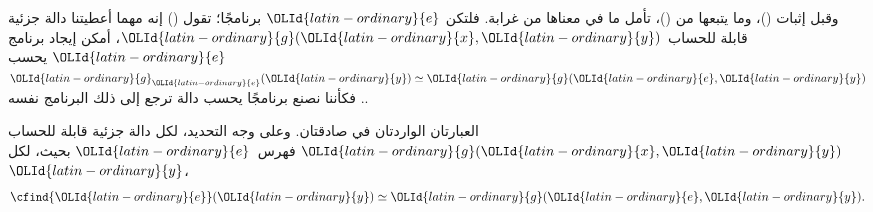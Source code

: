 \documentclass[../../../include/open-logic-section]{subfiles}
\begin{document}
\begin{explain}
وقبل إثبات ()، وما يتبعها من ()، تأمل ما في معناها من غرابة.
فلتكن $\OLId{latin-ordinary}{e}$ برنامجًا؛ تقول () إنه مهما أعطيتنا
دالة جزئية قابلة للحساب $\OLId{latin-ordinary}{g}(\OLId{latin-ordinary}{x},\OLId{latin-ordinary}{y})$، أمكن إيجاد برنامج $\OLId{latin-ordinary}{e}$
يحسب $\OLId{latin-ordinary}{g}_\OLId{latin-ordinary}{e}(\OLId{latin-ordinary}{y}) \simeq \OLId{latin-ordinary}{g}(\OLId{latin-ordinary}{e},\OLId{latin-ordinary}{y})$. فكأننا نصنع برنامجًا يحسب
دالة ترجع إلى ذلك البرنامج نفسه.
\end{explain}

\begin{thm}
العبارتان الواردتان في  صادقتان. وعلى وجه
التحديد، لكل دالة جزئية قابلة للحساب $\OLId{latin-ordinary}{g}(\OLId{latin-ordinary}{x},\OLId{latin-ordinary}{y})$ فهرس~$\OLId{latin-ordinary}{e}$ بحيث،
لكل~$\OLId{latin-ordinary}{y}$،
\[
\cfind{\OLId{latin-ordinary}{e}}(\OLId{latin-ordinary}{y}) \simeq \OLId{latin-ordinary}{g}(\OLId{latin-ordinary}{e},\OLId{latin-ordinary}{y}).
\]
\end{thm}
\end{document}
